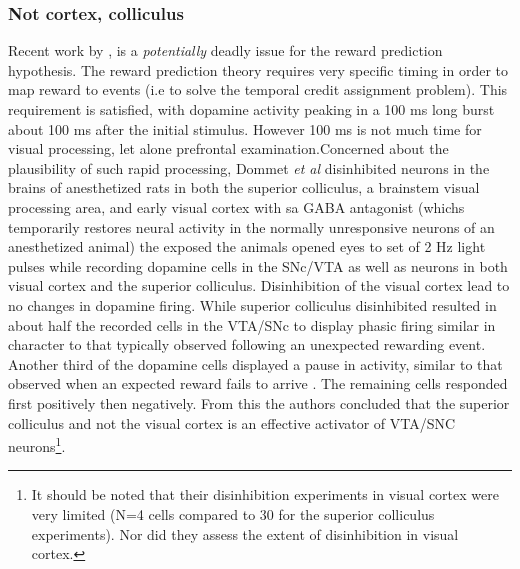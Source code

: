 \documentclass[doc,12pt]{apa}        %
\begin{document}
\subsubsection{Not cortex, colliculus}
\label{sub:not_cor_colliculu}
Recent work by , is a \emph{potentially} deadly issue for the reward prediction hypothesis.  The reward prediction theory requires very specific timing in order to map reward to events (i.e to solve the temporal credit assignment problem).  This requirement is satisfied, with dopamine activity peaking in a 100 ms long burst about 100 ms after the initial stimulus.  However 100 ms is not much time for visual processing, let alone prefrontal examination.Concerned about the plausibility of such rapid processing, Dommet \emph{et al} disinhibited neurons in the brains of anesthetized rats in both the superior colliculus, a brainstem visual processing area, and early visual cortex with sa GABA antagonist (whichs temporarily restores neural activity in the normally unresponsive neurons of an anesthetized animal) the exposed the animals opened eyes to set of 2 Hz light pulses while recording dopamine cells in the SNc/VTA as well as neurons in both visual cortex and the superior colliculus.  Disinhibition of the visual cortex lead to no changes in dopamine firing.  While superior colliculus disinhibited resulted in about half the recorded cells in the VTA/SNc to display phasic firing similar in character to that typically observed following an unexpected rewarding event.  Another third of the dopamine cells displayed a pause in activity, similar to that observed when an expected reward fails to arrive \cite{Mirenowicz:1994p7185}.  The remaining cells responded first positively then negatively.  From this the authors concluded that the superior colliculus and not the visual cortex is an effective activator of VTA/SNC neurons\footnote{
It should be noted that their disinhibition experiments in visual cortex were very limited (N=4 cells compared to 30 for the superior colliculus experiments).  Nor did they assess the extent of disinhibition in visual cortex.
 }. 
\end{document}
